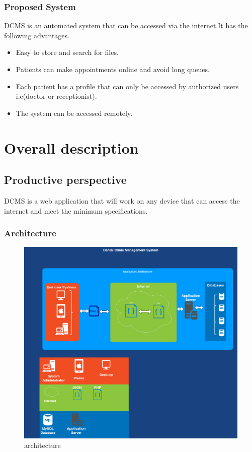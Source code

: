 \documentclass[11 pt]{article}
\begin{document}
\subsubsection{Proposed System}
DCMS is an automated system that can be accessed via the internet.It has the following advantages.
\begin{itemize}
\item
 Easy to store and search for files.
 \item
 Patients can make appointments online and avoid long queues.
 \item
 Each patient has a profile that can only be accessed by authorized users i.e(doctor or receptionist).
 \item
 The system can be accessed remotely.
 


\end{itemize}

\section{Overall description}
\newpage
    \subsection{Productive perspective}    
    DCMS is a web application  that will work on any device that can access the internet and meet the minimum specifications.
    \subsubsection{Architecture}
    
    \begin{figure}[h]
    \centering
    
    \includegraphics[width=\linewidth]{architecture.png}
    \caption{architecture}
    \end{figure}
    \newpage
\end{document}

